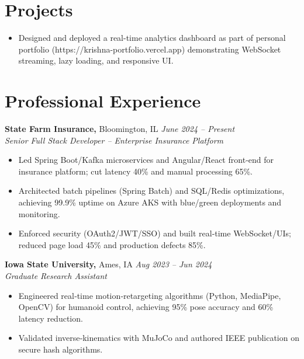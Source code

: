 \documentclass[10pt,a4paper]{article}
\begin{document}
\section{Projects}
\begin{itemize}
\item Designed and deployed a real-time analytics dashboard as part of personal portfolio (https://krishna-portfolio.vercel.app) demonstrating WebSocket streaming, lazy loading, and responsive UI.
\end{itemize}

\section{Professional Experience}

\textbf{State Farm Insurance,} Bloomington, IL \hfill \textit{June 2024 -- Present}\\
\textit{Senior Full Stack Developer -- Enterprise Insurance Platform}

\begin{itemize}
  \item Led Spring Boot/Kafka microservices and Angular/React front‑end for insurance platform; cut latency 40\% and manual processing 65\%.
  \item Architected batch pipelines (Spring Batch) and SQL/Redis optimizations, achieving 99.9\% uptime on Azure AKS with blue/green deployments and monitoring.
  \item Enforced security (OAuth2/JWT/SSO) and built real‑time WebSocket/UIs; reduced page load 45\% and production defects 85\%.
\end{itemize}

\textbf{Iowa State University,} Ames, IA \hfill \textit{Aug 2023 -- Jun 2024}\\
\textit{Graduate Research Assistant}

\begin{itemize}
  \item Engineered real‑time motion‑retargeting algorithms (Python, MediaPipe, OpenCV) for humanoid control, achieving 95\% pose accuracy and 60\% latency reduction.
  \item Validated inverse‑kinematics with MuJoCo and authored IEEE publication on secure hash algorithms.
\end{itemize}
\end{document}
